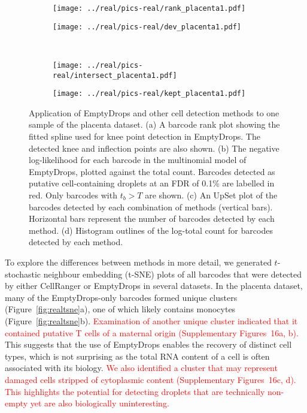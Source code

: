 \documentclass[10pt,letterpaper]{article}
\newcommand{\revised}[1]{\textcolor{red}{#1}}
\newcommand{\suppfigrealplacenta}{16}
\begin{document}
\begin{figure}[btp]
    \begin{center}
    \begin{subfigure}{0.49\textwidth}
        \texttt{[image: ../real/pics-real/rank\_placenta1.pdf]}
        \caption{}
    \end{subfigure}
    \begin{subfigure}{0.49\textwidth}
        \texttt{[image: ../real/pics-real/dev\_placenta1.pdf]}
        \caption{}
    \end{subfigure}\\[0.1in]
    \begin{subfigure}[b]{0.49\textwidth}
        \texttt{[image: ../real/pics-real/intersect\_placenta1.pdf]}
        \caption{}
    \end{subfigure}
    \begin{subfigure}[b]{0.49\textwidth}
        \texttt{[image: ../real/pics-real/kept\_placenta1.pdf]}
        \caption{}
    \end{subfigure}
\end{center}
    \caption{Application of EmptyDrops and other cell detection methods to one sample of the placenta dataset.
        (a) A barcode rank plot showing the fitted spline used for knee point detection in EmptyDrops. 
        The detected knee and inflection points are also shown.
        (b) The negative log-likelihood for each barcode in the multinomial model of EmptyDrops, plotted against the total count.
        Barcodes detected as putative cell-containing droplets at an FDR of 0.1\% are labelled in red.
        Only barcodes with $t_b > T$ are shown.
        (c) An UpSet plot \cite{lex2014upset} of the barcodes detected by each combination of methods (vertical bars).
        Horizontal bars represent the number of barcodes detected by each method.
        (d) Histogram outlines of the log-total count for barcodes detected by each method.
    }
\label{fig:realplacenta}
\end{figure}

To explore the differences between methods in more detail, we generated $t$-stochastic neighbour embedding (t-SNE) plots \cite{van2008visualizing} of all barcodes that were detected by either CellRanger or EmptyDrops in several datasets.
In the placenta dataset, many of the EmptyDrops-only barcodes formed unique clusters (Figure~\ref{fig:realtsne}a), one of which likely contains monocytes (Figure~\ref{fig:realtsne}b).
\revised{Examination of another unique cluster indicated that it contained putative T cells of a maternal origin (Supplementary Figures~\suppfigrealplacenta{}a, b).}
This suggests that the use of EmptyDrops enables the recovery of distinct cell types, which is not surprising as the total RNA content of a cell is often associated with its biology.
\revised{We also identified a cluster that may represent damaged cells stripped of cytoplasmic content (Supplementary Figures~\suppfigrealplacenta{}c, d).
This highlights the potential for detecting droplets that are technically non-empty yet are also biologically uninteresting.}
\end{document}
